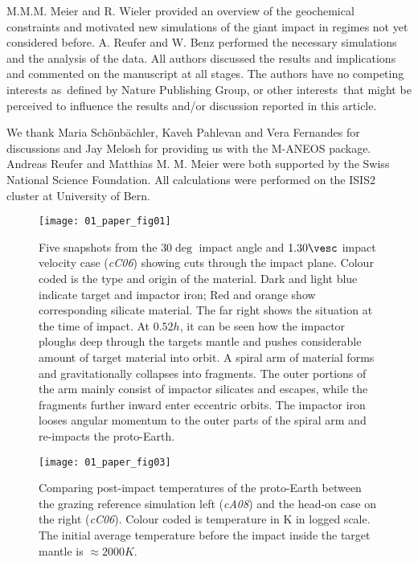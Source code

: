 M.M.M. Meier and R. Wieler provided an overview of the geochemical constraints and motivated new simulations of the giant impact in regimes not yet considered before. A. Reufer and W. Benz performed the necessary simulations and the analysis of the data. All authors discussed the results and implications and commented on the manuscript at all stages. The authors have no competing interests as defined by Nature Publishing Group, or other interests that might be perceived to influence the results and/or discussion reported in this article.

We thank Maria Schönbächler, Kaveh Pahlevan and Vera Fernandes for discussions and Jay Melosh for providing us with the M-ANEOS package. Andreas Reufer and Matthias M. M. Meier were both supported by the Swiss National Science Foundation. All calculations were performed on the ISIS2 cluster at University of Bern.

\begin{figure}
\begin{center}
\texttt{[image: 01\_paper\_fig01]}
\caption{Five snapshots from the $30 \deg$ impact angle and $1.30 \vesc$ impact velocity case (\emph{cC06}) showing cuts through the impact plane. Colour coded is the type and origin of the material. Dark and light blue indicate target and impactor iron; Red and orange show corresponding silicate material. The far right shows the situation at the time of impact. At $0.52 h$, it can be seen how the impactor ploughs deep through the targets mantle and pushes considerable amount of target material into orbit. A spiral arm of material forms and gravitationally collapses into fragments. The outer portions of the arm mainly consist of impactor silicates and escapes, while the fragments further inward enter eccentric orbits. The impactor iron looses angular momentum to the outer parts of the spiral arm and re-impacts the proto-Earth.}
\label{ch05_fig01a}
\end{center}
\end{figure}

\begin{figure}
\begin{center}
\texttt{[image: 01\_paper\_fig03]}
\caption{Comparing post-impact temperatures of the proto-Earth between the grazing reference simulation left (\emph{cA08}) and the head-on case on the right (\emph{cC06}). Colour coded is temperature in K in logged scale. The initial average temperature before the impact inside the target mantle is $\approx 2000 K$.}
\label{ch05_fig01c}
\end{center}
\end{figure}

